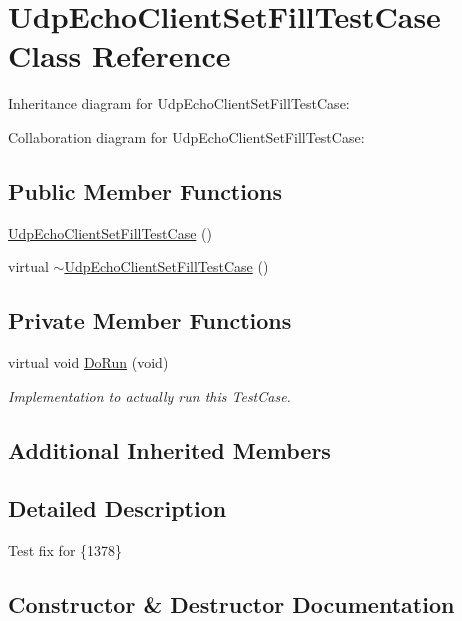 \hypertarget{classUdpEchoClientSetFillTestCase}{}\section{Udp\+Echo\+Client\+Set\+Fill\+Test\+Case Class Reference}
\label{classUdpEchoClientSetFillTestCase}


Inheritance diagram for Udp\+Echo\+Client\+Set\+Fill\+Test\+Case\+:


Collaboration diagram for Udp\+Echo\+Client\+Set\+Fill\+Test\+Case\+:
\subsection*{Public Member Functions}
\begin{DoxyCompactItemize}
\item 
\hyperlink{classUdpEchoClientSetFillTestCase_aa91e154ff6fe9dbd13b9385a064c45f1}{Udp\+Echo\+Client\+Set\+Fill\+Test\+Case} ()
\item 
virtual \hyperlink{classUdpEchoClientSetFillTestCase_a51ae73db83caa96f0fd15b751fc701c2}{$\sim$\+Udp\+Echo\+Client\+Set\+Fill\+Test\+Case} ()
\end{DoxyCompactItemize}
\subsection*{Private Member Functions}
\begin{DoxyCompactItemize}
\item 
virtual void \hyperlink{classUdpEchoClientSetFillTestCase_abab274bc5d6e6f303a96446710d650b2}{Do\+Run} (void)
\begin{DoxyCompactList}\small\item\em Implementation to actually run this Test\+Case. \end{DoxyCompactList}\end{DoxyCompactItemize}
\subsection*{Additional Inherited Members}


\subsection{Detailed Description}
Test fix for \{1378\} 

\subsection{Constructor \& Destructor Documentation}

